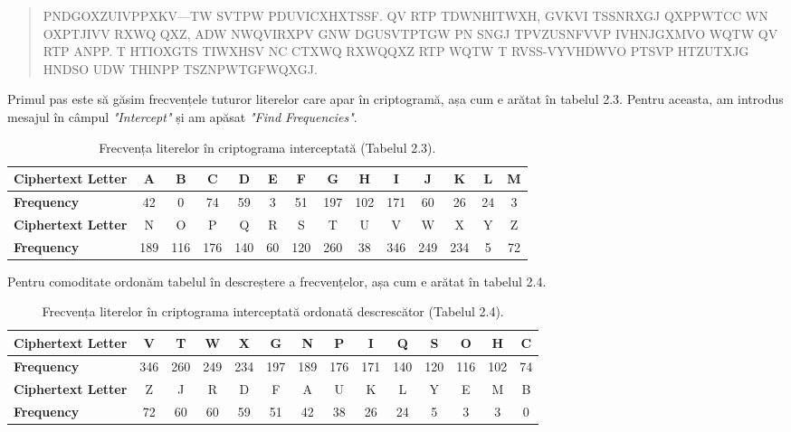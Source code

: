 \documentclass{labreport}
\begin{document}
\begin{quote}
PNDGOXZUIVPPXKV---TW SVTPW PDUVICXHXTSSF. QV RTP TDWNHITWXH, GVKVI TSSNRXGJ QXPPWTCC WN OXPTJIVV RXWQ QXZ, ADW NWQVIRXPV GNW DGUSVTPTGW PN SNGJ TPVZUSNFVVP IVHNJGXMVO WQTW QV RTP ANPP. T HTIOXGTS TIWXHSV NC CTXWQ RXWQQXZ RTP WQTW T RVSS-VYVHDWVO PTSVP HTZUTXJG HNDSO UDW THINPP TSZNPWTGFWQXGJ.
\end{quote}

Primul pas este să găsim frecvențele tuturor literelor care apar în criptogramă, așa cum e arătat în tabelul 2.3. Pentru aceasta, am introdus mesajul în câmpul \textit{"Intercept"} și am apăsat \textit{"Find Frequencies"}.

\begin{table}[H]
\centering
\footnotesize
\setlength{\tabcolsep}{3.5pt}
\caption{Frecvența literelor în criptograma interceptată (Tabelul 2.3).}
\label{tab:tab23}
\begin{tabular}{|l|c|c|c|c|c|c|c|c|c|c|c|c|c|}
\hline
\textbf{Ciphertext Letter} & A & B & C & D & E & F & G & H & I & J & K & L & M \\ \hline
\textbf{Frequency}         & 42 & 0 & 74 & 59 & 3 & 51 & 197 & 102 & 171 & 60 & 26 & 24 & 3 \\ \hline \hline
\textbf{Ciphertext Letter} & N & O & P & Q & R & S & T & U & V & W & X & Y & Z \\ \hline
\textbf{Frequency}         & 189 & 116 & 176 & 140 & 60 & 120 & 260 & 38 & 346 & 249 & 234 & 5 & 72 \\ \hline
\end{tabular}
\end{table}

Pentru comoditate ordonăm tabelul în descreștere a frecvențelor, așa cum e arătat în tabelul 2.4.

\begin{table}[H]
\centering
\footnotesize
\setlength{\tabcolsep}{3.5pt}
\caption{Frecvența literelor în criptograma interceptată ordonată descrescător (Tabelul 2.4).}
\label{tab:tab24}
\begin{tabular}{|l|c|c|c|c|c|c|c|c|c|c|c|c|c|}
\hline
\textbf{Ciphertext Letter} & V & T & W & X & G & N & P & I & Q & S & O & H & C \\ \hline
\textbf{Frequency}         & 346 & 260 & 249 & 234 & 197 & 189 & 176 & 171 & 140 & 120 & 116 & 102 & 74 \\ \hline \hline
\textbf{Ciphertext Letter} & Z & J & R & D & F & A & U & K & L & Y & E & M & B \\ \hline
\textbf{Frequency}         & 72 & 60 & 60 & 59 & 51 & 42 & 38 & 26 & 24 & 5 & 3 & 3 & 0 \\ \hline
\end{tabular}
\end{table}
\end{document}

